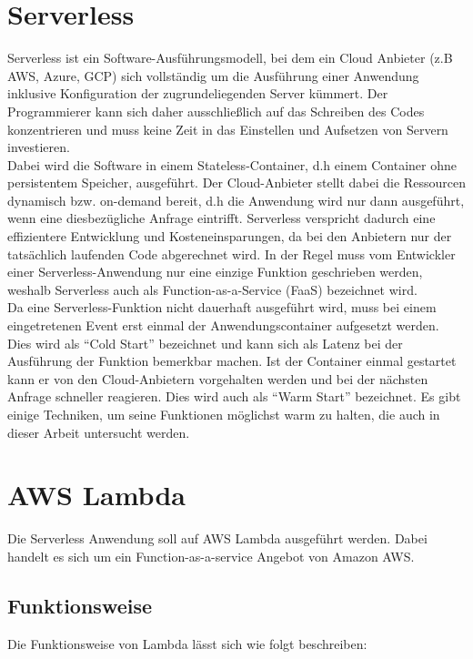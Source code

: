 \section{Serverless}
Serverless ist ein Software-Ausführungsmodell, bei dem ein Cloud Anbieter (z.B AWS, Azure, GCP) sich vollständig um die Ausführung einer Anwendung inklusive Konfiguration der zugrundeliegenden Server kümmert. Der Programmierer kann sich daher ausschließlich auf das Schreiben des Codes konzentrieren und muss keine Zeit in das Einstellen und Aufsetzen von Servern investieren. \\
Dabei wird die Software in einem Stateless-Container, d.h einem Container ohne persistentem Speicher, ausgeführt. Der Cloud-Anbieter stellt dabei die Ressourcen dynamisch bzw. on-demand bereit, d.h die Anwendung wird nur dann ausgeführt, wenn eine diesbezügliche Anfrage eintrifft. Serverless verspricht dadurch eine effizientere Entwicklung und Kosteneinsparungen, da bei den Anbietern nur der tatsächlich laufenden Code abgerechnet wird. In der Regel muss vom Entwickler einer Serverless-Anwendung nur eine einzige Funktion geschrieben werden, weshalb Serverless auch als Function-as-a-Service (FaaS) bezeichnet wird\cite{noauthor_was_2016}. \\
Da eine Serverless-Funktion nicht dauerhaft ausgeführt wird, muss bei einem eingetretenen Event erst einmal der Anwendungscontainer aufgesetzt werden. Dies wird als "`Cold Start"' bezeichnet und kann sich als Latenz bei der Ausführung der Funktion bemerkbar machen. Ist der Container einmal gestartet kann er von den Cloud-Anbietern vorgehalten werden und bei der nächsten Anfrage schneller reagieren. Dies wird auch als "`Warm Start"' bezeichnet\cite{noauthor_was_2016}. Es gibt einige Techniken, um seine Funktionen möglichst warm zu halten, die auch in dieser Arbeit untersucht werden.

\section{AWS Lambda}
Die Serverless Anwendung soll auf AWS Lambda ausgeführt werden. Dabei handelt es sich um ein Function-as-a-service Angebot von Amazon AWS.

\subsection{Funktionsweise}
Die Funktionsweise von Lambda lässt sich wie folgt beschreiben\cite{amazon_aws_aws_2020}:

